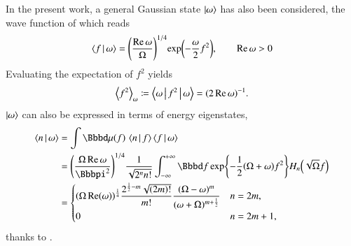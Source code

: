 In the present work, a general Gaussian state $\Ket{\omega}$ has also been 
considered, the wave function of which reads
\begin{equation}
\Braket{f | \omega} = {\left(\frac{\Re\omega}{\Omega}\right)}^{1/4}
{\exp}\mathopen{}\left(-\frac{\omega}{2}f^2\right)\mathclose{},\qquad \Re \omega > 0
\label{eq:general-single-omega}
\end{equation}
Evaluating the expectation of $f^2$ yields
\begin{equation}
{\left<f^2\right>}_\omega \coloneqq \Braket{\omega | f^2 | \omega}
= {\left(2\Re \omega\right)}^{-1}.
\label{eq:correlator-1}
\end{equation}
$\Ket{\omega}$ can also be expressed in terms of energy eigenstates,
\begin{align}
\Braket{n | \omega} &= \int \rfun{\dd \mu}{f}\, \Braket{n | f} 
\Braket{f | \omega} \nonumber \\
&= \rbr{\frac{\Omega \Re\omega}{\pp^2}}^{1/4} \frac{1}{\sqrt{2^n n!}}
\int_{-\infty}^{+\infty} \dd f\,
\cfun{\exp}{-\frac{1}{2}\rbr{\Omega+\omega}f^2}\rfun{H_n}{\sqrt{\Omega}f}
\nonumber \\
&= \begin{cases} \rbr{\Omega  \Re(\omega )}^{\frac{1}{4}}
\dfrac{2^{\frac{1}{2}-m} \sqrt{(2 m)!} }{m!}
\dfrac{(\Omega -\omega )^m}{(\omega +\Omega )^{m+\frac{1}{2}}}
& n = 2m, \\
0 & n = 2m+1,
\end{cases}
\label{eq:n|omega}
\end{align}
thanks to \cite{Babusci2012}.

